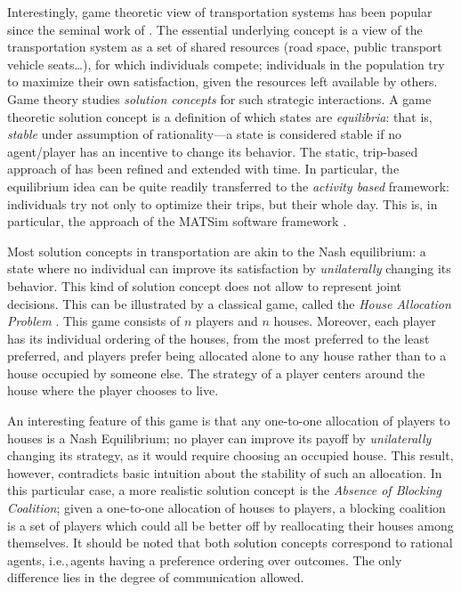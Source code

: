 {Interestingly, game theoretic view of transportation systems has been popular since the seminal work of \citet{Wardrop_PICE_1952}. The essential underlying concept is a view of the transportation system as a set of shared resources (road space, public transport vehicle seats\ldots), for which individuals compete; individuals in the population try to maximize their own satisfaction, given the resources left available by others. Game theory studies \emph{solution concepts} for such strategic interactions. A game theoretic solution concept is a definition of which states are \emph{equilibria}: that is, \emph{stable} under assumption of rationality---a state is considered stable if no agent/player has an incentive to change its behavior. The static, trip-based approach of \citet{Wardrop_PICE_1952} has been refined and extended with time. In particular, the equilibrium idea can be quite readily transferred to the \emph{activity based} framework: individuals try not only to optimize their trips, but their whole day. This is, in particular, the approach of the MATSim software framework \citep{Axhausen_SSRL_2006, NagelFloetteroed2009IatbrResourceInBook}.

Most solution concepts in transportation are akin to the Nash equilibrium: a state where no individual can improve its satisfaction by \emph{unilaterally} changing its behavior. This kind of solution concept does not allow to represent joint decisions. This can be illustrated by a classical game, called the \emph{House Allocation Problem} \citep{SchummerVohra_NisanEtAl_2007}. This game consists of $n$ players and $n$ houses. Moreover, each player has its individual ordering of the houses, from the most preferred to the least preferred, and players prefer being allocated alone to any house rather than to a house occupied by someone else. The strategy of a player centers around the house where the player chooses to live.

An interesting feature of this game is that any one-to-one allocation of players to houses is a Nash Equilibrium; no player can improve its payoff by \emph{unilaterally} changing its strategy, as it would require choosing an occupied house. This result, however, contradicts basic intuition about the stability of such an allocation. In this particular case, a more realistic solution concept is the \emph{Absence of Blocking Coalition}; given a one-to-one allocation of houses to players, a blocking coalition is a set of players which could all be better off by reallocating their houses among themselves. It should be noted that both solution concepts correspond to rational agents, i.e.,\,agents having a preference ordering over outcomes. The only difference lies in the degree of communication allowed.

}
